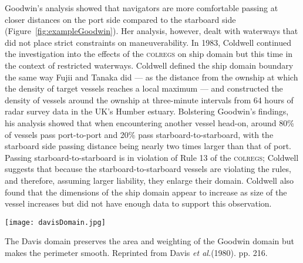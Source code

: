 \documentclass[twoside,symmetric,notoc]{tufte-book}
\newcommand{\etal}{\textit{et al.}\xspace}
\begin{document}
\par{%
Goodwin's analysis showed that navigators are more comfortable passing at closer distances on the port side compared to the starboard side (Figure~\ref{fig:exampleGoodwin}). Her analysis, however, dealt with waterways that did not place strict constraints on maneuverability. In 1983, Coldwell\cite{Coldwell} continued the investigation into the effects of the \textsc{colregs} on ship domain but this time in the context of restricted waterways. Coldwell defined the ship domain boundary the same way Fujii and Tanaka did --- as the distance from the ownship at which the density of target vessels reaches a local maximum --- and constructed the density of vessels around the ownship at three-minute intervals from 64 hours of radar survey data in the UK's Humber estuary. Bolstering Goodwin's findings, his analysis showed that when encountering another vessel head-on, around 80\% of vessels pass port-to-port and 20\% pass starboard-to-starboard, with the starboard side passing distance being nearly two times larger than that of port. Passing starboard-to-starboard is in violation of Rule 13 of the \textsc{colregs}; Coldwell suggests that because the starboard-to-starboard vessels are violating the rules, and therefore, assuming larger liability, they enlarge their domain. Coldwell also found that the dimensions of the ship domain appear to increase as size of the vessel increases but did not have enough data to support this observation.
}
\begin{marginfigure}
\centering
	\texttt{[image: davisDomain.jpg]}
	\caption[The Davis domain preserves the area and weighting of the Goodwin domain but makes the perimeter smooth.]{The Davis domain preserves the area and weighting of the Goodwin domain but makes the perimeter smooth. Reprinted from Davis \etal (1980). pp. 216.}
	\label{fig:davisDomain}
\end{marginfigure}
\end{document}
